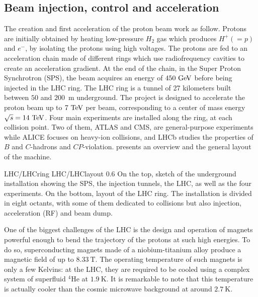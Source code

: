     \subsection{Beam injection, control and acceleration}

    The creation and first acceleration of the proton beam work as follow. Protons are initially
    obtained by heating low-pressure $H_2$ gas which produces $H^+ (= p)$ and $e^-$, by isolating
    the protons using high voltages. The protons are fed to an acceleration
    chain made of different rings which use radiofrequency cavities to create an acceleration
    gradient. At the end of the chain, in the Super Proton Synchrotron (SPS), the
    beam acquires an energy of $450~\text{GeV}$ before being injected in the LHC ring. The LHC
    ring is a tunnel of 27 kilometers built between $50$ and $200$~m underground. The
    project is designed to accelerate the proton beam up to $7~\text{TeV}$ per beam,
    corresponding to a center of mass energy $\sqrt{s} = 14~\text{TeV}$. Four main experiments are
    installed along the ring, at each collision point. Two of them, ATLAS and CMS, are
    general-purpose experiments while ALICE focuses on heavy-ion collisions, and LHCb studies
    the properties of $B$ and $C$-hadrons and $CP$-violation.  presents an
    overview and the general layout of the machine.

                     {LHC/LHCring}
                     {LHC/LHClayout}
                     {0.6}
                     {On the top, sketch of the underground installation showing the SPS,
                     the injection tunnels, the LHC, as well as the four experiments. On
                     the bottom, layout of the LHC ring. The installation is divided in
                     eight octants, with some of them dedicated to collisions but also
                     injection, acceleration (RF) and beam dump.}

    One of the biggest challenges of the LHC is the design and operation of magnets
    powerful enough to bend the trajectory of the protons at such high energies. To do
    so, superconducting magnets made of a niobium-titanium alloy
    produce a magnetic field of up to $8.33~\text{T}$. The operating temperature of such magnets
    is only a few Kelvins: at the LHC, they are required to be cooled using
    a complex system of superfluid $^4$He at $1.9~\text{K}$. It is remarkable to note that this
    temperature is actually cooler than the cosmic microwave background at around $2.7~\text{K}$.

